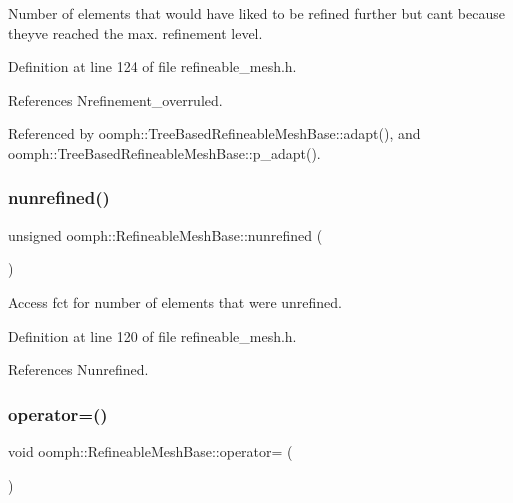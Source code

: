 Number of elements that would have liked to be refined further but can\textquotesingle{}t because they\textquotesingle{}ve reached the max. refinement level. 



Definition at line 124 of file refineable\+\_\+mesh.\+h.



References Nrefinement\+\_\+overruled.



Referenced by oomph\+::\+Tree\+Based\+Refineable\+Mesh\+Base\+::adapt(), and oomph\+::\+Tree\+Based\+Refineable\+Mesh\+Base\+::p\+\_\+adapt().

\mbox{\label{classoomph_1_1RefineableMeshBase_a1d3d3c72721e97e4fa24e1d7dc13f2b5}} 
\subsubsection{\texorpdfstring{nunrefined()}{nunrefined()}}
{\footnotesize\ttfamily unsigned oomph\+::\+Refineable\+Mesh\+Base\+::nunrefined (\begin{DoxyParamCaption}{ }\end{DoxyParamCaption})\hspace{0.3cm}{\ttfamily [inline]}}



Access fct for number of elements that were unrefined. 



Definition at line 120 of file refineable\+\_\+mesh.\+h.



References Nunrefined.

\mbox{\label{classoomph_1_1RefineableMeshBase_a8d88b478b38015e7d37ca5bbfe216b80}} 
\subsubsection{\texorpdfstring{operator=()}{operator=()}}
{\footnotesize\ttfamily void oomph\+::\+Refineable\+Mesh\+Base\+::operator= (\begin{DoxyParamCaption}\item[{const \hyperlink{classoomph_1_1RefineableMeshBase}{Refineable\+Mesh\+Base} \&}]{ }\end{DoxyParamCaption})\hspace{0.3cm}{\ttfamily [inline]}}



